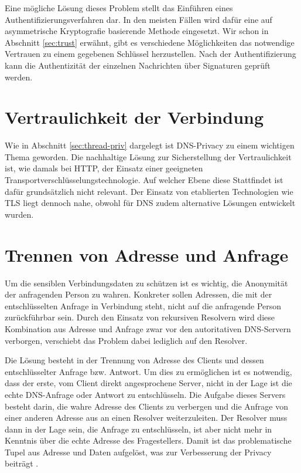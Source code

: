 Eine mögliche Lösung dieses Problem stellt das Einführen eines Authentifizierungsverfahren dar. In den meisten Fällen wird dafür eine auf asymmetrische Kryptografie basierende Methode eingesetzt. Wir schon in Abschnitt \ref{sec:trust} erwähnt, gibt es verschiedene Möglichkeiten das notwendige Vertrauen zu einem gegebenen Schlüssel herzustellen. Nach der Authentifizierung kann die Authentizität der einzelnen Nachrichten über Signaturen geprüft werden.

\section{Vertraulichkeit der Verbindung}
Wie in Abschnitt \ref{sec:thread-priv} dargelegt ist DNS-Privacy zu einem wichtigen Thema geworden. Die nachhaltige Lösung zur Sicherstellung der Vertraulichkeit ist, wie damals bei HTTP, der Einsatz einer geeigneten Transportverschlüsselungstechnologie. Auf welcher Ebene diese Stattfindet ist dafür grundsätzlich nicht relevant. Der Einsatz von etablierten Technologien wie TLS liegt dennoch nahe, obwohl für DNS zudem alternative Lösungen entwickelt wurden. 

\section{Trennen von Adresse und Anfrage}
\label{sec:goals-sourceanon}
Um die sensiblen Verbindungsdaten zu schützen ist es wichtig, die Anonymität der anfragenden Person zu wahren. Konkreter sollen Adressen, die mit der entschlüsselten Anfrage in Verbindung steht, nicht auf die anfragende Person zurückführbar sein. Durch den Einsatz von rekursiven Resolvern wird diese Kombination aus Adresse und Anfrage zwar vor den autoritativen DNS-Servern verborgen, verschiebt das Problem dabei lediglich auf den Resolver. 

Die Lösung besteht in der Trennung von Adresse des Clients und dessen entschlüsselter Anfrage bzw. Antwort. Um dies zu ermöglichen ist es notwendig, dass der erste, vom Client direkt angesprochene Server, nicht in der Lage ist die echte DNS-Anfrage oder Antwort zu entschlüsseln. Die Aufgabe dieses Servers besteht darin, die wahre Adresse des Clients zu verbergen und die Anfrage von einer anderen Adresse aus an einen Resolver weiterzuleiten. Der Resolver muss dann in der Lage sein, die Anfrage zu entschlüsseln, ist aber nicht mehr in Kenntnis über die echte Adresse des Fragestellers. Damit ist das problematische Tupel aus Adresse und Daten aufgelöst, was zur Verbesserung der Privacy beiträgt \cite{Schmitt2018}.

